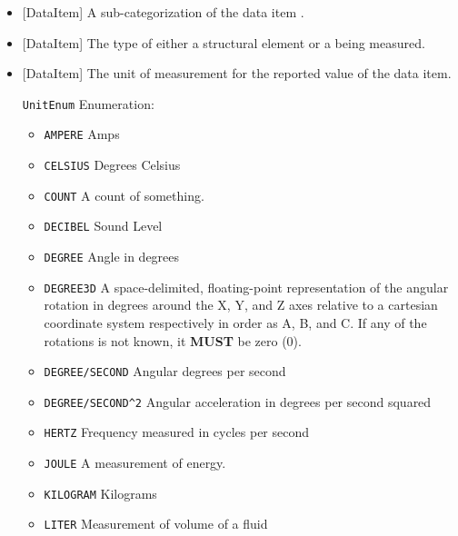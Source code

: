 \begin{itemize}
\item {}[DataItem] \newline A sub-categorization of the data item .

\item {}[DataItem] \newline The type of either a \gls{structural element} or a  being measured.

\item {}[DataItem] \newline The unit of measurement for the reported value of the data item.

\texttt{UnitEnum} Enumeration:

\begin{itemize}
\item \texttt{AMPERE} \newline Amps 
\item \texttt{CELSIUS} \newline Degrees Celsius 
\item \texttt{COUNT} \newline A count of something. 
\item \texttt{DECIBEL} \newline Sound Level 
\item \texttt{DEGREE} \newline Angle in degrees 
\item \texttt{DEGREE\textunderscore 3D} \newline A space-delimited, floating-point representation of the angular rotation in degrees around the X, Y, and Z axes relative to a cartesian coordinate system respectively in order as A, B, and C. If any of the rotations is not known, it \textbf{MUST} be zero (0). 
\item \texttt{DEGREE/SECOND} \newline Angular degrees per second 
\item \texttt{DEGREE/SECOND\^{}2} \newline Angular acceleration in degrees per second squared 
\item \texttt{HERTZ} \newline Frequency measured in cycles per second 
\item \texttt{JOULE} \newline A measurement of energy. 
\item \texttt{KILOGRAM} \newline Kilograms 
\item \texttt{LITER} \newline Measurement of volume of a fluid 

\end{itemize}
\end{itemize}
